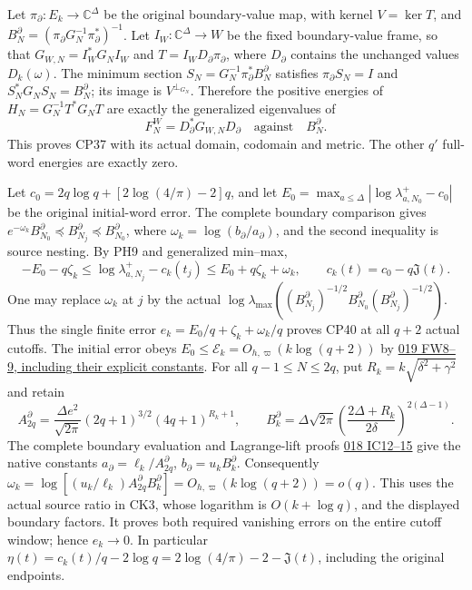 \documentclass[10pt]{article}
\begin{document}
Let \(\pi_\partial:E_k\to\mathbb C^\Delta\) be the original boundary-value map, with kernel \(V=\ker T\), and \(B_N^\partial=(\pi_\partial G_N^{-1}\pi_\partial^*)^{-1}\). Let \(I_W:\mathbb C^\Delta\to W\) be the fixed boundary-value frame, so that \(G_{W,N}=I_W^*G_NI_W\) and \(T=I_WD_\partial\pi_\partial\), where \(D_\partial\) contains the unchanged values \(D_k(\omega)\). The minimum section \(S_N=G_N^{-1}\pi_\partial^*B_N^\partial\) satisfies \(\pi_\partial S_N=I\) and \(S_N^*G_NS_N=B_N^\partial\); its image is \(V^{\perp_{G_N}}\). Therefore the positive energies of \(H_N=G_N^{-1}T^*G_NT\) are exactly the generalized eigenvalues of \[
 F_N^W=D_\partial^*G_{W,N}D_\partial
 \quad\text{against}\quad B_N^\partial.
 \tag{PH10}
\] This proves CP37 with its actual domain, codomain and metric. The other \(q'\) full-word energies are exactly zero.

Let \(c_0=2q\log q+[2\log(4/\pi)-2]q\), and let \(E_0=\max_{a\le\Delta}|\log\lambda_{a,N_0}^+-c_0|\) be the original initial-word error. The complete boundary comparison gives \(e^{-\omega_k}B_{N_0}^\partial\preceq B_{N_j}^\partial\preceq B_{N_0}^\partial\), where \(\omega_k=\log(b_\partial/a_\partial)\), and the second inequality is source nesting. By PH9 and generalized min--max, \[
 -E_0-q\zeta_k
 \le\log\lambda_{a,N_j}^+-c_k(t_j)
 \le E_0+q\zeta_k+\omega_k,\qquad
 c_k(t)=c_0-q\mathfrak J(t).
 \tag{PH11}
\] One may replace \(\omega_k\) at \(j\) by the actual \(\log\lambda_{\max}((B_{N_j}^\partial)^{-1/2}
 B_{N_0}^\partial(B_{N_j}^\partial)^{-1/2})\). Thus the single finite error \(e_k=E_0/q+\zeta_k+\omega_k/q\) proves CP40 at all \(q+2\) actual cutoffs. The initial error obeys \(E_0\le\mathcal E_k=O_{h,\varpi}(k\log(q+2))\) by \href{https://github.com/KokunoYumeto/zeta-function-research-reader/blob/9b7b0bad40b33dc88bba7d8cb1548da1fadbb585/workbenches/splitzero-tandem/continuations/20260921-original-angle-word/WORD_PROOFS.md\#L80}{019 FW8--9, including their explicit constants}. For all \(q-1\le N\le2q\), put \(R_k=k\sqrt{\delta^2+\gamma^2}\) and retain \[
 A_{2q}^{\partial}=\frac{\Delta e^2}{\sqrt{2\pi}}
 (2q+1)^{3/2}(4q+1)^{R_k+1},\qquad
 B_k^\partial=\Delta\sqrt{2\pi}
 \left(\frac{2\Delta+R_k}{2\delta}\right)^{2(\Delta-1)}.
\] The complete boundary evaluation and Lagrange-lift proofs \href{https://github.com/KokunoYumeto/zeta-function-research-reader/blob/75256b0237884bdef0074c2ac6310de1ea32ec26/workbenches/splitzero-tandem/continuations/20260921-invariant-collision/COLLISION_PROOFS.md\#L125}{018 IC12--15} give the native constants \(a_\partial=\ell_k/A_{2q}^{\partial}\), \(b_\partial=u_kB_k^\partial\). Consequently \(\omega_k=\log[(u_k/\ell_k)A_{2q}^{\partial}B_k^\partial]
=O_{h,\varpi}(k\log(q+2))=o(q)\). This uses the actual source ratio in CK3, whose logarithm is \(O(k+\log q)\), and the displayed boundary factors. It proves both required vanishing errors on the entire cutoff window; hence \(e_k\to0\). In particular \(\eta(t)=c_k(t)/q-2\log q
=2\log(4/\pi)-2-\mathfrak J(t)\), including the original endpoints.
\end{document}
